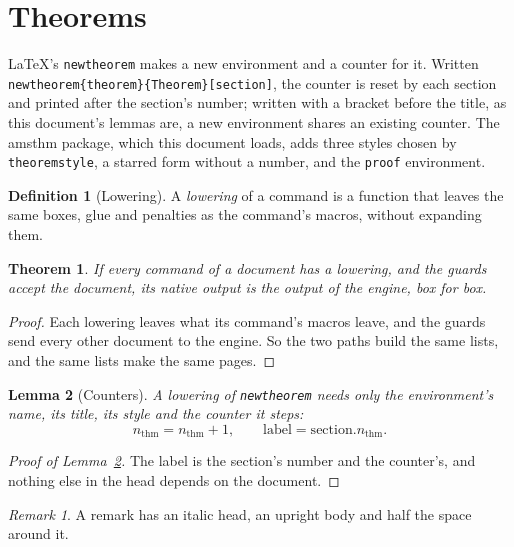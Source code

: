 \documentclass{article}
\numberwithin{equation}{section}
\newtheorem{theorem}{Theorem}[section]
\newtheorem{lemma}[theorem]{Lemma}
\theoremstyle{definition}
\newtheorem{definition}{Definition}
\theoremstyle{remark}
\newtheorem*{remark}{Remark}
\begin{document}
\section{Theorems}\label{sec:theorems}

\LaTeX's \texttt{newtheorem} makes a new environment and a counter for it. Written
\texttt{newtheorem\{theorem\}\{Theorem\}[section]}, the counter is reset by each section
and printed after the section's number; written with a bracket before the title, as this
document's lemmas are, a new environment shares an existing counter. The amsthm package,
which this document loads, adds three styles chosen by \texttt{theoremstyle}, a starred
form without a number, and the \texttt{proof} environment.

\begin{definition}[Lowering]\label{def:lowering}
A \emph{lowering} of a command is a function that leaves the same boxes, glue and
penalties as the command's macros, without expanding them.
\end{definition}

\begin{theorem}\label{thm:guard}
If every command of a document has a lowering, and the guards accept the document, its
native output is the output of the engine, box for box.
\end{theorem}

\begin{proof}
Each lowering leaves what its command's macros leave, and the guards send every other
document to the engine. So the two paths build the same lists, and the same lists make
the same pages.
\end{proof}

\begin{lemma}[Counters]\label{lem:counters}
A lowering of \texttt{newtheorem} needs only the environment's name, its title, its style
and the counter it steps: \[ n_{\mathrm{thm}} = n_{\mathrm{thm}} + 1, \qquad
\mathrm{label} = \mathrm{section}.n_{\mathrm{thm}}. \]
\end{lemma}

\begin{proof}[Proof of Lemma~\ref{lem:counters}]
The label is the section's number and the counter's, and nothing else in the head
depends on the document.
\end{proof}

\begin{remark}
A remark has an italic head, an upright body and half the space around it.
\end{remark}
\end{document}
